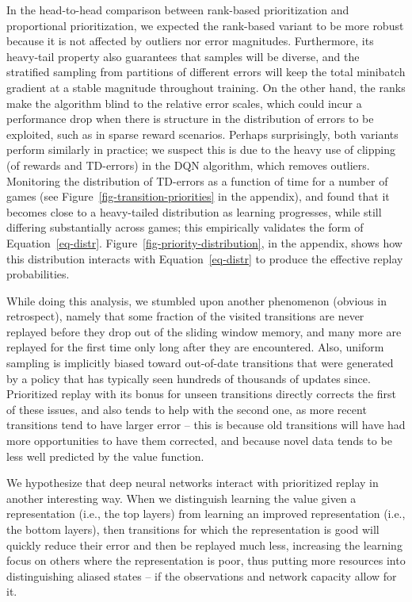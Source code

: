 \documentclass[a4paper]{article}
\begin{document}
In the head-to-head comparison between rank-based prioritization and proportional prioritization,
we expected the rank-based variant to be more robust because it is not affected by outliers nor error magnitudes. 
Furthermore, its heavy-tail property also guarantees that samples will be diverse,
and the stratified sampling from partitions of different errors 
will keep the total minibatch gradient at a stable magnitude throughout training.
On the other hand, the ranks make the algorithm blind 
to the relative error scales, which could incur a performance drop when there is structure in the distribution of
errors to be exploited, such as in sparse reward scenarios. Perhaps surprisingly, both variants perform similarly in practice; we suspect this is
due to the heavy use of clipping (of rewards and TD-errors) in the DQN algorithm, which removes outliers.
Monitoring the distribution of TD-errors as a function of time for a number of games
(see Figure~\ref{fig-transition-priorities} in the appendix), 
and found that it becomes close to a heavy-tailed distribution as learning progresses,
while still differing substantially across games;  this empirically validates the form of Equation~\ref{eq-distr}.
Figure~\ref{fig-priority-distribution}, in the appendix, shows how this distribution interacts with Equation~\ref{eq-distr} 
to produce the effective replay probabilities.


While doing this analysis, we stumbled upon another phenomenon (obvious in retrospect), 
namely that some fraction of the visited transitions are never replayed 
before they drop out of the sliding window memory, 
and many more are replayed for the first time only long after they are encountered.
Also, uniform sampling is implicitly 
biased toward out-of-date transitions that were generated by a policy that has typically seen hundreds of thousands of updates since.
Prioritized replay with its bonus for unseen transitions directly corrects the first of these issues, 
and also tends to help with the second one, as more recent transitions tend to have larger error -- 
this is because old transitions will have had more opportunities to have them corrected, and
because novel data tends to be less well predicted by the value function.


We hypothesize that deep neural networks interact with prioritized replay in another interesting way. 
When we distinguish learning the value given a representation (i.e., the top layers)
from learning an improved representation (i.e., the bottom layers),
then transitions for which the representation is good will quickly reduce their error and then be replayed much less,
increasing the learning focus on others where the representation is poor, 
thus putting more resources into distinguishing aliased states -- if the observations and network capacity allow for it.
\end{document}
